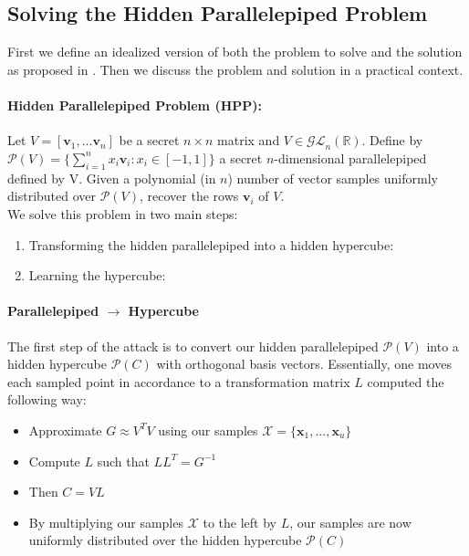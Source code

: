 \subsection{Solving the Hidden Parallelepiped Problem}
First we define an idealized version of both the problem to solve and the solution as proposed in \cite{hpp}. Then we discuss the problem and solution in a practical context.
\paragraph{Hidden Parallelepiped Problem (HPP):} Let $\mathit{V} = [\mathbf{v}_1, ... \mathbf{v}_n ]$ be a secret $n \times n$ matrix and $\mathit{V} \in \mathcal{GL}_n (\mathbb{R})$.
Define by $\mathcal{P}(\mathit{V}) = \{\sum_{i=1}^{n} x_i \mathbf{v}_i : x_i \in [-1, 1]\}$ a secret $n$-dimensional parallelepiped defined by V.
Given a polynomial (in $n$) number of vector samples uniformly distributed over $\mathcal{P}(\mathit{V})$, recover the rows $\mathbf{v}_i$ of $\mathit{V}$. \\
We solve this problem in two main steps: 
\begin{enumerate}
    \item Transforming the hidden parallelepiped into a hidden hypercube:
    \item Learning the hypercube:
\end{enumerate}
\paragraph{Parallelepiped $\rightarrow$ Hypercube}
The first step of the attack is to convert our hidden parallelepiped $\mathcal{P}(\mathit{V})$ into a hidden hypercube $\mathcal{P}(\mathit{C})$ with orthogonal basis vectors.
Essentially, one moves each sampled point in accordance to a transformation matrix $\mathit{L}$ computed the following way: \\
\begin{itemize}
    \item Approximate $\mathit{G} \approx \mathit{V}^T \mathit{V}$ using our samples $\mathcal{X} = \{\mathbf{x}_1, ..., \mathbf{x}_u\}$
    \item Compute $\mathit{L}$ such that $\mathit{L} \mathit{L}^{T} = \mathit{G}^{-1}$
    \item Then $\mathit{C} = \mathit{V} \mathit{L}$
    \item By multiplying our samples $\mathcal{X}$ to the left by $\mathit{L}$, our samples are now uniformly distributed over the hidden hypercube $\mathcal{P}(\mathit{C})$
\end{itemize}

